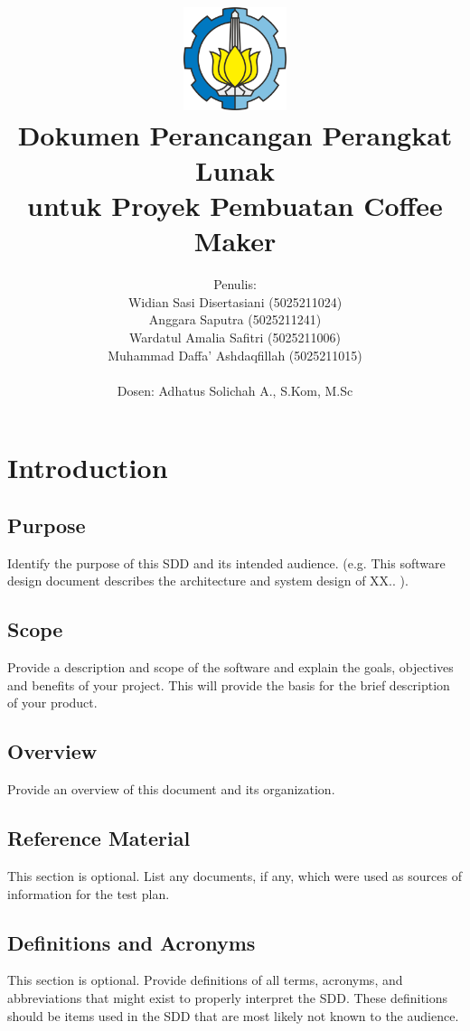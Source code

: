 \documentclass[12pt]{article}
\title{
{\includegraphics[width=3cm, height=3cm]{img/LambangITS.png}}
\\
{Dokumen Perancangan Perangkat Lunak \\untuk Proyek Pembuatan Coffee Maker}
}
\author{Penulis: 
\\Widian Sasi Disertasiani (5025211024) \\
Anggara Saputra (5025211241) \\
Wardatul Amalia Safitri (5025211006) \\
Muhammad Daffa’ Ashdaqfillah (5025211015) \\  
 \\ Dosen: Adhatus Solichah A., S.Kom, M.Sc}
\begin{document}
\maketitle

\section{Introduction}
\subsection{Purpose}
Identify the purpose of this SDD and its intended audience. (e.g. This software design
document describes the architecture and system design of XX.. ).


\subsection{Scope}
Provide a description and scope of the software and explain the goals, objectives and benefits
of your project. This will provide the basis for the brief description of your product.


\subsection{Overview}
Provide an overview of this document and its organization.



\subsection{Reference Material}
This section is optional.
List any documents, if any, which were used as sources of information for the test plan. 


\subsection{Definitions and Acronyms}
This section is optional.
Provide  definitions of all terms, acronyms, and  abbreviations that might exist to  properly 
interpret the SDD. These definitions should be items used in the SDD that are most likely not 
known to the audience.
\end{document}

